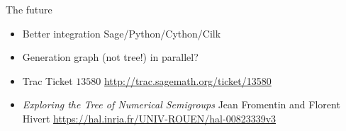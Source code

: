 \documentclass[compress,11pt]{beamer}
\begin{document}
\begin{frame}{The future}

  \begin{itemize}
  \item Better integration Sage/Python/Cython/Cilk
    \bigskip

  \item Generation graph (not tree!) in parallel?
  \end{itemize}
  \bigskip  \bigskip

  \begin{itemize}
  \item Trac Ticket $13580$ \url{http://trac.sagemath.org/ticket/13580}
    \bigskip

  \item \textit{Exploring the Tree of Numerical Semigroups}
    Jean Fromentin and Florent Hivert
    \url{https://hal.inria.fr/UNIV-ROUEN/hal-00823339v3}

  \end{itemize}
\end{frame}
\end{document}
